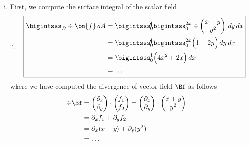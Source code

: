 \documentclass[12pt]{article}
\begin{document}
\begin{enumerate}[(i)]
	\item First, we compute the surface integral of the scalar field
	      \begin{align}
		      \label{eq:firstresult}
		      \therefore\quad
		      \boxed{
			      \begin{aligned}
				      \bigintsss_B \div \bm{f} \, dA
				       & =\bigintsss_0^1 \!\!\! \bigintsss_0^{2x}
				      \div
				      \begin{pmatrix} x+y\\y^2 \end{pmatrix} \, dy \, dx                     \\
				       & =\bigintsss_0^1 \!\!\! \bigintsss_0^{2x} \Big(1+2y\Big) \, dy \, dx \\
				       & =\bigintsss_0^1 \Big( 4x^2 + 2x \Big) \, dx                         \\
				       & = \dots
			      \end{aligned}
		      }
	      \end{align}
	      where we have computed the divergence of vector field $\Bf$ as follows
	      \begin{align}
		      \div \Bf 
		       & = 	
		      \begin{pmatrix} \partial_x \\ \partial_y \end{pmatrix}
		      \cdot 
		      \begin{pmatrix} f_1 \\ f_2 \end{pmatrix}
		      =
		      \begin{pmatrix} \partial_x \\ \partial_y \end{pmatrix}
		      \cdot 
		      \begin{pmatrix} x+y \\ y^2 \end{pmatrix} \\
		       & 
		      = \partial_x f_1 + \partial_yf_2         \\
		       & 
		      = \partial_x (x+y) + \partial_y(y^2)     \\
		       & 
		      = \dots
	      \end{align}
	      

\end{enumerate}
\end{document}
